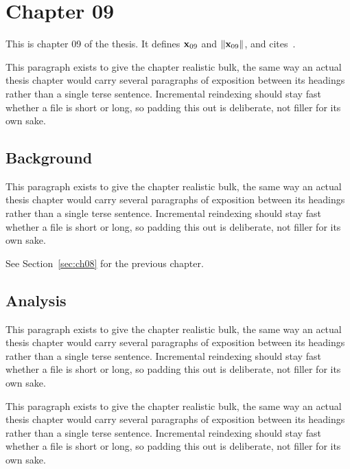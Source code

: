 \section{Chapter 09}
\label{sec:ch09}

This is chapter 09 of the thesis. It defines $\mathbf{x}_{09}$ and $\lVert \mathbf{x}_{09} \rVert$, and cites~\cite{ref1}.

This paragraph exists to give the chapter realistic bulk, the same way an actual thesis chapter would carry several paragraphs of exposition between its headings rather than a single terse sentence. Incremental reindexing should stay fast whether a file is short or long, so padding this out is deliberate, not filler for its own sake.

\subsection{Background}
\label{sec:ch09:background}

This paragraph exists to give the chapter realistic bulk, the same way an actual thesis chapter would carry several paragraphs of exposition between its headings rather than a single terse sentence. Incremental reindexing should stay fast whether a file is short or long, so padding this out is deliberate, not filler for its own sake.

See Section~\ref{sec:ch08} for the previous chapter.

\subsection{Analysis}
\label{sec:ch09:analysis}

This paragraph exists to give the chapter realistic bulk, the same way an actual thesis chapter would carry several paragraphs of exposition between its headings rather than a single terse sentence. Incremental reindexing should stay fast whether a file is short or long, so padding this out is deliberate, not filler for its own sake.

This paragraph exists to give the chapter realistic bulk, the same way an actual thesis chapter would carry several paragraphs of exposition between its headings rather than a single terse sentence. Incremental reindexing should stay fast whether a file is short or long, so padding this out is deliberate, not filler for its own sake.
